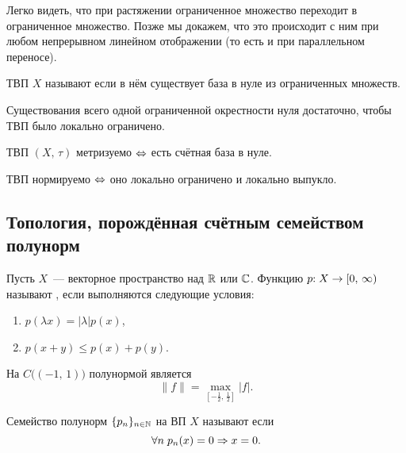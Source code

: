 \documentclass{notes}
\begin{document}
	\begin{st}
		Легко видеть, что при растяжении ограниченное множество переходит в ограниченное множество. Позже мы докажем, что это происходит с ним при любом непрерывном линейном отображении (то есть и при параллельном переносе).
	\end{st}

	\begin{de}
		ТВП $X$ называют  если в нём существует база в нуле из ограниченных множеств.
	\end{de}

	\begin{st}
		Существования всего одной ограниченной окрестности нуля достаточно, чтобы ТВП было локально ограничено.
	\end{st}

	\begin{thm}
		ТВП $(X, \, \tau)$ метризуемо $\Leftrightarrow$ есть счётная база в нуле. 
	\end{thm}

	\begin{thm}[Колмогоров]
		ТВП нормируемо $\Leftrightarrow$ оно локально ограничено и локально выпукло.
	\end{thm}

\subsection{Топология, порождённая счётным семейством полунорм}

	\begin{de}
		Пусть $X$~--- векторное пространство над $\mathbb{R}$ или $\mathbb{C}$. Функцию 
		$p\text{\text{:}} \; X \to [0, \, \infty)$ называют , если выполняются следующие условия:
		\begin{enumerate}
			\item $p(\lambda x) = |\lambda| p(x)$,
			\item $p(x + y) \leqslant p(x) + p(y)$.
		\end{enumerate}
	\end{de}

	\begin{exm}
		На $C\big((-1, \, 1)\big)$ полунормой является
		\[
			\|f\| = \max\limits_{\left[-\tfrac{1}{2}, \, \tfrac{1}{2}\right]} |f|.
		\]
	\end{exm}

	\begin{de}
		Семейство полунорм $\{p_n\}_{n \in \mathbb{N}}$ на ВП $X$ называют  если 
		\[
			\forall n \; p_n(x) = 0 \Rightarrow x = 0.
		\] 
	\end{de}
\end{document}

